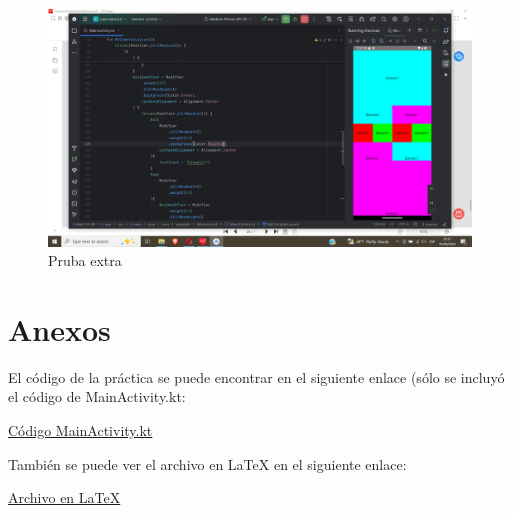 \documentclass{article}
\begin{document}
\begin{figure}[H]
    \centering
    \includegraphics[width=1\linewidth]{3.png}
    \caption{Pruba extra}
    \label{fig:enter-label}
\end{figure}

\section{Anexos}

El código de la práctica se puede encontrar en el siguiente enlace (sólo se incluyó el código de MainActivity.kt:

\href{https://github.com/YoelCanaza/UniversityProjects/blob/c53c0969b7d803a3e589fa0b6541304063ea60f4/Desarrollo%20Basado%20en%20Plataformas%20II/Pr%C3%A1cticaLaboratorio4/MainActivity.kt}{Código MainActivity.kt}

También se puede ver el archivo en LaTeX en el siguiente enlace:

\href{}{Archivo en LaTeX}
\end{document}
